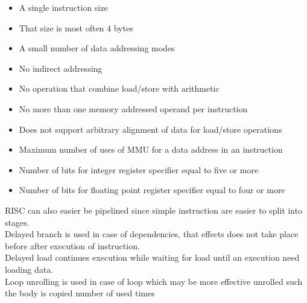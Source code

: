 \documentclass[12pt, a4paper]{article}
\begin{document}
			\begin{itemize}
				\item A single instruction size
				\item That size is most often 4 bytes
				\item A small number of data addressing modes
				\item No indirect addressing
				\item No operation that combine load/store with arithmetic
				\item No more than one memory addressed operand per instruction
				\item Does not support arbitrary alignment of data for load/store operations
				\item Maximum number of uses of MMU for a data address in an instruction
				\item Number of bits for integer register specifier equal to five or more
				\item Number of bits for floating point register specifier equal to four or more
			\end{itemize}
			RISC can also easier be pipelined since simple instruction are easier to split into stages.\\
			Delayed branch is used in case of dependencies, that effects does not take place before after execution of instruction.\\
			Delayed load continues execution while waiting for load until an execution need loading data.\\
			Loop unrolling is used in case of loop which may be more effective unrolled such the body is copied number of used times
\end{document}
